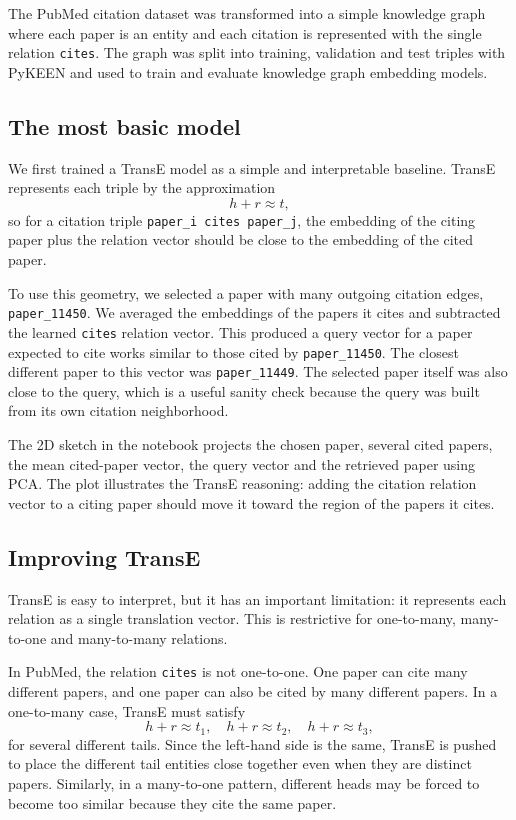 \documentclass[11pt]{article}
\begin{document}
The PubMed citation dataset was transformed into a simple knowledge graph where each paper is an entity and each citation is represented with the single relation \texttt{cites}. The graph was split into training, validation and test triples with PyKEEN and used to train and evaluate knowledge graph embedding models.

\subsection{The most basic model}

We first trained a TransE model as a simple and interpretable baseline. TransE represents each triple by the approximation
\[
    h + r \approx t,
\]
so for a citation triple \texttt{paper\_i cites paper\_j}, the embedding of the citing paper plus the relation vector should be close to the embedding of the cited paper.

To use this geometry, we selected a paper with many outgoing citation edges, \texttt{paper\_11450}. We averaged the embeddings of the papers it cites and subtracted the learned \texttt{cites} relation vector. This produced a query vector for a paper expected to cite works similar to those cited by \texttt{paper\_11450}. The closest different paper to this vector was \texttt{paper\_11449}. The selected paper itself was also close to the query, which is a useful sanity check because the query was built from its own citation neighborhood.

The 2D sketch in the notebook projects the chosen paper, several cited papers, the mean cited-paper vector, the query vector and the retrieved paper using PCA. The plot illustrates the TransE reasoning: adding the citation relation vector to a citing paper should move it toward the region of the papers it cites.

\subsection{Improving TransE}

TransE is easy to interpret, but it has an important limitation: it represents each relation as a single translation vector. This is restrictive for one-to-many, many-to-one and many-to-many relations.

In PubMed, the relation \texttt{cites} is not one-to-one. One paper can cite many different papers, and one paper can also be cited by many different papers. In a one-to-many case, TransE must satisfy
\[
    h + r \approx t_1, \quad h + r \approx t_2, \quad h + r \approx t_3,
\]
for several different tails. Since the left-hand side is the same, TransE is pushed to place the different tail entities close together even when they are distinct papers. Similarly, in a many-to-one pattern, different heads may be forced to become too similar because they cite the same paper.
\end{document}
